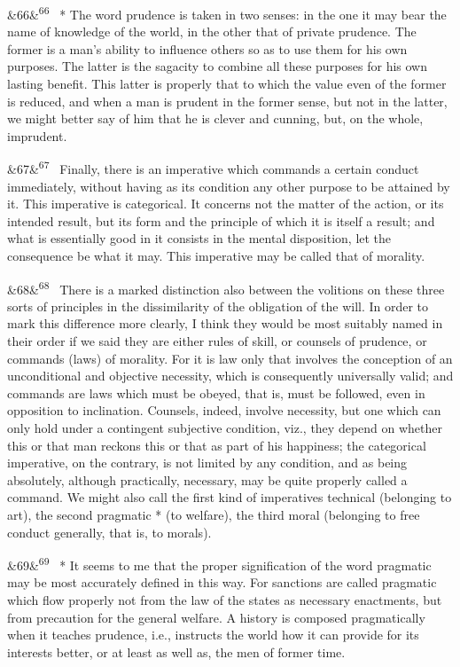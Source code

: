 \documentclass[12pt]{article}
\newcommand{\para}[1][]{\par\noindent\ifx&#1&\else\textsuperscript{\footnotesize #1}~\fi}
\begin{document}
\para[66] * The word prudence is taken in two senses: in the one it may bear the name of knowledge of the world, in the other that of private prudence. The former is a man's ability to influence others so as to use them for his own purposes. The latter is the sagacity to combine all these purposes for his own lasting benefit. This latter is properly that to which the value even of the former is reduced, and when a man is prudent in the former sense, but not in the latter, we might better say of him that he is clever and cunning, but, on the whole, imprudent.

\para[67] Finally, there is an imperative which commands a certain conduct immediately, without having as its condition any other purpose to be attained by it. This imperative is categorical. It concerns not the matter of the action, or its intended result, but its form and the principle of which it is itself a result; and what is essentially good in it consists in the mental disposition, let the consequence be what it may. This imperative may be called that of morality.

\para[68] There is a marked distinction also between the volitions on these three sorts of principles in the dissimilarity of the obligation of the will. In order to mark this difference more clearly, I think they would be most suitably named in their order if we said they are either rules of skill, or counsels of prudence, or commands (laws) of morality. For it is law only that involves the conception of an unconditional and objective necessity, which is consequently universally valid; and commands are laws which must be obeyed, that is, must be followed, even in opposition to inclination. Counsels, indeed, involve necessity, but one which can only hold under a contingent subjective condition, viz., they depend on whether this or that man reckons this or that as part of his happiness; the categorical imperative, on the contrary, is not limited by any condition, and as being absolutely, although practically, necessary, may be quite properly called a command. We might also call the first kind of imperatives technical (belonging to art), the second pragmatic * (to welfare), the third moral (belonging to free conduct generally, that is, to morals).

\para[69] * It seems to me that the proper signification of the word pragmatic may be most accurately defined in this way. For sanctions are called pragmatic which flow properly not from the law of the states as necessary enactments, but from precaution for the general welfare. A history is composed pragmatically when it teaches prudence, i.e., instructs the world how it can provide for its interests better, or at least as well as, the men of former time.
\end{document}
